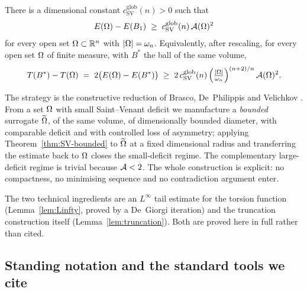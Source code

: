 \begin{theorem}\label{thm:SV-global}
There is a dimensional constant $c_{\mathrm{SV}}^{\mathrm{glob}}(n)>0$
such that
\begin{equation}\label{eq:SV-global}
   E(\Omega)-E(B_1)\;\ge\;c_{\mathrm{SV}}^{\mathrm{glob}}(n)\,\mathcal{A}(\Omega)^2
\end{equation}
for every open set $\Omega\subset\mathbb{R}^n$ with $\left|\Omega\right|=\omega_n$.
Equivalently, after rescaling, for every open set $\Omega$ of finite
measure, with $B^*$ the ball of the same volume,
\begin{equation}\label{eq:T-global}
   T(B^*)-T(\Omega)\;=\;2\bigl(E(\Omega)-E(B^*)\bigr)\;\ge\;
   2\,c_{\mathrm{SV}}^{\mathrm{glob}}(n)\,
   \Bigl(\tfrac{\left|\Omega\right|}{\omega_n}\Bigr)^{(n+2)/n}\,\mathcal{A}(\Omega)^2 .
\end{equation}
\end{theorem}

The strategy is the constructive reduction of Brasco, De~Philippis and
Velichkov \cite[\S5]{BDV}. From a set $\Omega$ with small Saint--Venant
deficit we manufacture a \emph{bounded} surrogate $\widetilde{\Omega}$, of the same
volume, of dimensionally bounded diameter, with comparable deficit and
with controlled loss of asymmetry; applying
Theorem~\ref{thm:SV-bounded} to $\widetilde{\Omega}$ at a fixed dimensional radius
and transferring the estimate back to $\Omega$ closes the small-deficit
regime. The complementary large-deficit regime is trivial because
$\mathcal{A}<2$. The whole construction is explicit: no compactness, no
minimising sequence and no contradiction argument enter.

The two technical ingredients are an $L^\infty$ tail estimate for the
torsion function (Lemma~\ref{lem:Linfty}, proved by a De~Giorgi
iteration) and the truncation construction itself
(Lemma~\ref{lem:truncation}). Both are proved here in full rather than
cited.

\subsection{Standing notation and the standard tools we cite}
\label{ssec:notation}

